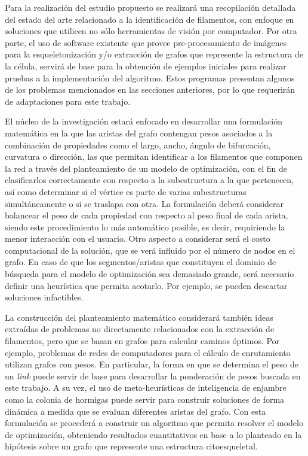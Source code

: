 \documentclass{article}
\begin{document}
Para la realizaci\'on del estudio propuesto se realizar\'a una recopilaci\'on detallada del estado del arte relacionado a la identificaci\'on de filamentos, con enfoque en soluciones que utilicen no s\'olo herramientas de visi\'on por computador.
Por otra parte, el uso de software existente que provee pre-procesamiento de im\'agenes para la esqueletonizaci\'on y/o extracción de grafos que represente la estructura de la c\'elula, servir\'a de base para la obtenci\'on de ejemplos iniciales para realizar pruebas a la implementaci\'on del algoritmo. Estos programas presentan algunos de los problemas mencionados en las secciones anteriores, por lo que requerir\'an de adaptaciones para este trabajo.  


El n\'ucleo de la investigaci\'on estar\'a enfocado en desarrollar una formulaci\'on matem\'atica en la que las aristas del grafo contengan pesos asociados a la combinaci\'on de propiedades como el largo, ancho, \'angulo de bifurcación, curvatura o direcci\'on, las que permitan identificar a los filamentos que componen la red a trav\'es del planteamiento de un modelo de optimizaci\'on, con el fin de clasificarlos correctamente con respecto a la subestructura a la que pertenecen, as\'i como determinar si el v\'ertice es parte de varias subestructuras simult\'aneamente o si se traslapa con otra.
La formulaci\'on deber\'a considerar balancear el peso de cada propiedad con respecto al peso final de cada arista, siendo este procedimiento lo m\'as autom\'atico posible, es decir, requiriendo la menor interacci\'on con el usuario. Otro aspecto a considerar ser\'a el costo computacional de la soluci\'on, que se ver\'a influido por el n\'umero de nodos en el grafo. En caso de que los segmentos/aristas que constituyen el dominio de b\'usqueda para el modelo de optimizaci\'on sea demasiado grande, ser\'a necesario definir una heur\'istica que permita acotarlo. Por ejemplo, se pueden descartar soluciones infactibles. 

La construcci\'on del planteamiento matem\'atico considerar\'a tambi\'en ideas extra\'idas de problemas no directamente relacionados con la extracci\'on de filamentos, pero que se basan en grafos para calcular caminos \'optimos. Por ejemplo, problemas de redes de computadores para el c\'alculo de enrutamiento utilizan grafos con pesos. En particular, la forma en que se determina el peso de un {\it link} puede servir de base para desarrollar la ponderaci\'on de pesos buscada en este trabajo. A su vez, el uso de meta-heur\'isticas de inteligencia de enjambre como la colonia de hormigas puede servir para construir soluciones de forma din\'amica a medida que se evaluan diferentes aristas del grafo.
Con esta formulaci\'on se proceder\'a a construir un algoritmo que permita resolver el modelo de optimizaci\'on, obteniendo resultados cuantitativos en base a lo planteado en la hip\'otesis sobre un grafo que represente una estructura citoesqueletal. 
\end{document}
